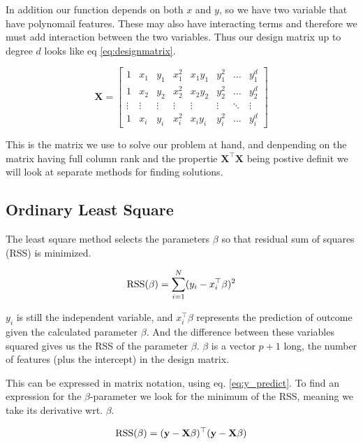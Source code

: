 \documentclass[a4paper,12pt, english]{article}
\begin{document}
In addition our function depends on both $x$ and $y$, so we have two variable that have polynomail features. These may also have interacting terms and therefore we must add interaction between the two variables. Thus our design matrix up to degree $d$ looks like eq \ref{eq:designmatrix}.

\begin{equation}\label{eq:designmatrix}
\mathbf{X} = 
\begin{bmatrix}
1 & x_1 & y_1 & x_1^2 & x_1y_1 & y_1^2 & \dots  & y_1^d \\
1 & x_2 & y_2 & x_2^2 & x_2y_2 & y_2^2 & \dots  & y_2^d \\
\vdots & \vdots & \vdots & \vdots & \vdots & \vdots & \ddots & \vdots \\
1 & x_i & y_i & x_i^2 & x_iy_i & y_i^2 & \dots  & y_i^d
\end{bmatrix}
\end{equation}

This is the matrix we use to solve our problem at hand, and denpending on the matrix having full column rank and the propertie $\mathbf{X^{\top}}\mathbf{X}$ being postive definit we will look at separate methods for finding solutions.

\subsection*{Ordinary Least Square}

The least square method selects the parameters $\beta$ so that residual sum of squares (RSS) is minimized.

\begin{equation}
\textnormal{RSS}(\beta) = \sum_{i=1}^{N} (y_i - x_i^{\top}\beta)^2
\end{equation}

$y_i$ is still the independent variable, and $x_i^{\top}\beta$ represents the prediction of outcome given the calculated parameter $\beta$. And the difference between these variables squared gives us the RSS of the parameter $\beta$. $\beta$ is a vector $p + 1$ long, the number of features (plus the intercept) in the design matrix. 

This can be expressed in matrix notation, using eq. \ref{eq:y_predict}. To find an expression for the $\beta$-parameter we look for the minimum of the RSS, meaning we take its derivative wrt. $\beta$.

\begin{equation}
\textnormal{RSS}(\beta) = (\mathbf{y} - \mathbf{X}\beta)^{\top}(\mathbf{y} - \mathbf{X}\beta)
\end{equation}
\end{document}
